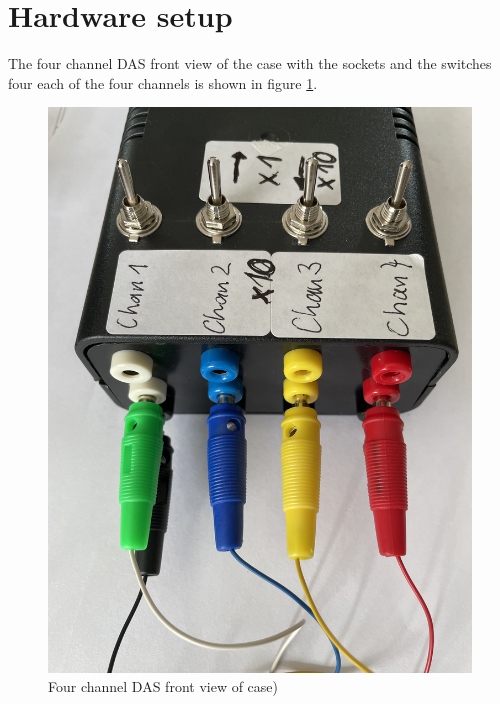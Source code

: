 \documentclass[11pt, oneside]{scrartcl}   	%
\begin{document}
\section{Hardware setup}
The four channel DAS front view of the case with the sockets and the switches four each of the four channels is shown in figure \ref{fig:HWExternals}.
\begin{figure}[htbp]
	\centering
	\includegraphics[angle=180,width=0.85\linewidth]{Figures/HWExternals.jpeg}
	\caption{Four channel DAS front view of case)}
	\label{fig:HWExternals}
\end{figure}
\end{document}
